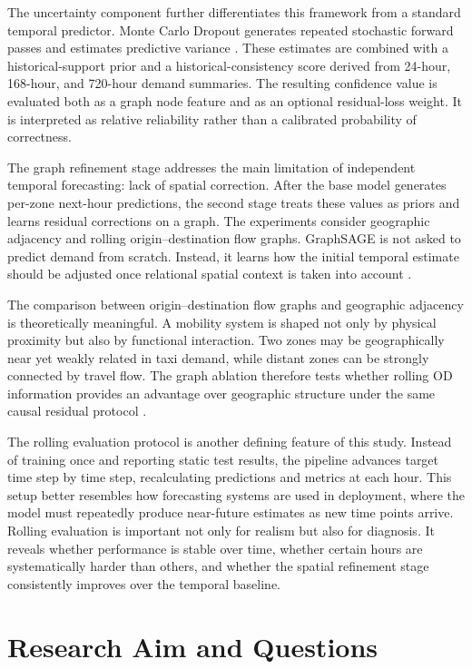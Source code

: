 \documentclass[12pt,a4paper]{report}
\begin{document}
The uncertainty component further differentiates this framework from a standard temporal predictor. Monte Carlo Dropout generates repeated stochastic forward passes and estimates predictive variance \cite{gal2016dropout}. These estimates are combined with a historical-support prior and a historical-consistency score derived from 24-hour, 168-hour, and 720-hour demand summaries. The resulting confidence value is evaluated both as a graph node feature and as an optional residual-loss weight. It is interpreted as relative reliability rather than a calibrated probability of correctness.

The graph refinement stage addresses the main limitation of independent temporal forecasting: lack of spatial correction. After the base model generates per-zone next-hour predictions, the second stage treats these values as priors and learns residual corrections on a graph. The experiments consider geographic adjacency and rolling origin--destination flow graphs. GraphSAGE is not asked to predict demand from scratch. Instead, it learns how the initial temporal estimate should be adjusted once relational spatial context is taken into account \cite{hamilton2017graphsage}.

The comparison between origin--destination flow graphs and geographic adjacency is theoretically meaningful. A mobility system is shaped not only by physical proximity but also by functional interaction. Two zones may be geographically near yet weakly related in taxi demand, while distant zones can be strongly connected by travel flow. The graph ablation therefore tests whether rolling OD information provides an advantage over geographic structure under the same causal residual protocol \cite{xue_2020_spatialtemporal,ke2021od}.

The rolling evaluation protocol is another defining feature of this study. Instead of training once and reporting static test results, the pipeline advances target time step by time step, recalculating predictions and metrics at each hour. This setup better resembles how forecasting systems are used in deployment, where the model must repeatedly produce near-future estimates as new time points arrive. Rolling evaluation is important not only for realism but also for diagnosis. It reveals whether performance is stable over time, whether certain hours are systematically harder than others, and whether the spatial refinement stage consistently improves over the temporal baseline.

\section{Research Aim and Questions}
\end{document}
